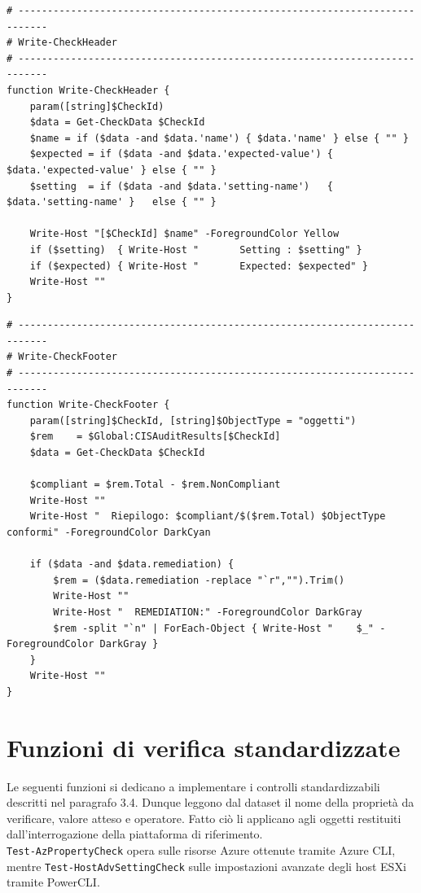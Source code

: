 \documentclass[a4paper,11pt]{report}
\begin{document}
\begin{lstlisting}[style=azcli, caption={Funzione \texttt{Write-CheckHeader}}, label={lst:write-check-header}]
# ---------------------------------------------------------------------------
# Write-CheckHeader 
# ---------------------------------------------------------------------------
function Write-CheckHeader {
    param([string]$CheckId)
    $data = Get-CheckData $CheckId
    $name = if ($data -and $data.'name') { $data.'name' } else { "" }
    $expected = if ($data -and $data.'expected-value') { $data.'expected-value' } else { "" }
    $setting  = if ($data -and $data.'setting-name')   { $data.'setting-name' }   else { "" }

    Write-Host "[$CheckId] $name" -ForegroundColor Yellow
    if ($setting)  { Write-Host "       Setting : $setting" }
    if ($expected) { Write-Host "       Expected: $expected" }
    Write-Host ""
}
\end{lstlisting}

\begin{lstlisting}[style=azcli, caption={Funzione \texttt{Write-CheckFooter}}, label={lst:write-check-footer}]
# ---------------------------------------------------------------------------
# Write-CheckFooter 
# ---------------------------------------------------------------------------
function Write-CheckFooter {
    param([string]$CheckId, [string]$ObjectType = "oggetti")
    $rem    = $Global:CISAuditResults[$CheckId]
    $data = Get-CheckData $CheckId

    $compliant = $rem.Total - $rem.NonCompliant
    Write-Host ""
    Write-Host "  Riepilogo: $compliant/$($rem.Total) $ObjectType conformi" -ForegroundColor DarkCyan

    if ($data -and $data.remediation) {
        $rem = ($data.remediation -replace "`r","").Trim()
        Write-Host ""
        Write-Host "  REMEDIATION:" -ForegroundColor DarkGray
        $rem -split "`n" | ForEach-Object { Write-Host "    $_" -ForegroundColor DarkGray }
    }
    Write-Host ""
}
\end{lstlisting}

\section{Funzioni di verifica standardizzate}
\label{app:generiche}

Le seguenti funzioni si dedicano a implementare i controlli standardizzabili descritti nel paragrafo 3.4.
Dunque leggono dal dataset il nome della proprietà da verificare, valore atteso e operatore. Fatto ciò li applicano agli oggetti restituiti dall'interrogazione della piattaforma di riferimento.\\
\texttt{Test-AzPropertyCheck} opera sulle risorse Azure ottenute tramite Azure CLI, mentre \texttt{Test-HostAdvSettingCheck} sulle impostazioni avanzate degli host ESXi tramite PowerCLI.
\end{document}
